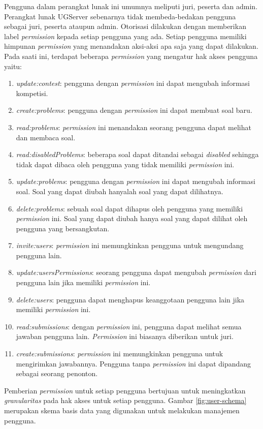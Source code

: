 Pengguna dalam perangkat lunak ini umumnya meliputi juri, peserta dan admin. Perangkat lunak UGServer sebenarnya tidak membeda-bedakan pengguna sebagai juri, peserta ataupun admin. Otorisasi dilakukan dengan memberikan label \textit{permission} kepada setiap pengguna yang ada. Setiap pengguna memiliki himpunan \textit{permission} yang menandakan aksi-aksi apa saja yang dapat dilakukan. Pada saati ini, terdapat beberapa \textit{permission} yang mengatur hak akses pengguna yaitu:
\begin{enumerate}
    \item \textit{update:contest}: pengguna dengan \textit{permission} ini dapat mengubah informasi kompetisi.
    \item \textit{create:problems}: pengguna dengan \textit{permission} ini dapat membuat soal baru.
    \item \textit{read:problems}: \textit{permission} ini menandakan seorang pengguna dapat melihat dan membaca soal.
    \item \textit{read:disabledProblems}: beberapa soal dapat ditandai sebagai \textit{disabled} sehingga tidak dapat dibaca oleh pengguna yang tidak memiliki \textit{permission} ini.
    \item \textit{update:problems}: pengguna dengan \textit{permission} ini dapat mengubah informasi soal. Soal yang dapat diubah hanyalah soal yang dapat dilihatnya.
    \item \textit{delete:problems}: sebuah soal dapat dihapus oleh pengguna yang memiliki \textit{permission} ini. Soal yang dapat diubah hanya soal yang dapat dilihat oleh pengguna yang bersangkutan.
    \item \textit{invite:users}: \textit{permission} ini memungkinkan pengguna untuk mengundang pengguna lain.
    \item \textit{update:usersPermissions}: seorang pengguna dapat mengubah \textit{permission} dari pengguna lain jika memiliki \textit{permission} ini.
    \item \textit{delete:users}: pengguna dapat menghapus keanggotaan pengguna lain jika memiliki \textit{permission} ini.
    \item \textit{read:submissions}: dengan \textit{permission} ini, pengguna dapat melihat semua jawaban pengguna lain. \textit{Permission} ini biasanya diberikan untuk juri.
    \item \textit{create:submissions}: \textit{permission} ini memungkinkan pengguna untuk mengirimkan jawabannya. Pengguna tanpa \textit{permission} ini dapat dipandang sebagai seorang penonton.
\end{enumerate}
Pemberian \textit{permission} untuk setiap pengguna bertujuan untuk meningkatkan \textit{granularitas} pada hak akses untuk setiap pengguna. Gambar \ref{fig:user-schema} merupakan skema basis data yang digunakan untuk melakukan manajemen pengguna.

